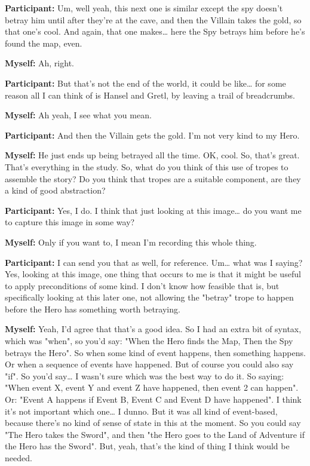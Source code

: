 \documentclass[11pt]{report}
\begin{document}
\begin{linenumbers}
\textbf{Participant:} Um, well yeah, this next one is similar except the spy doesn't betray him until after they're at the cave, and then the Villain takes the gold, so that one's cool. And again, that one makes\ldots{} here the Spy betrays him before he's found the map, even.

\textbf{Myself:} Ah, right.

\textbf{Participant:} But that's not the end of the world, it could be like\ldots{} for some reason all I can think of is Hansel and Gretl, by leaving a trail of breadcrumbs.

\textbf{Myself:} Ah yeah, I see what you mean.

\textbf{Participant:} And then the Villain gets the gold. I'm not very kind to my Hero.

\textbf{Myself:} He just ends up being betrayed all the time. OK, cool. So, that's great. That's everything in the study. So, what do you think of this use of tropes to assemble the story? Do you think that tropes are a suitable component, are they a kind of good abstraction?

\textbf{Participant:} Yes, I do. I think that just looking at this image\ldots{} do you want me to capture this image in some way?

\textbf{Myself:} Only if you want to, I mean I'm recording this whole thing.

\textbf{Participant:} I can send you that as well, for reference. Um\ldots{} what was I saying? Yes, looking at this image, one thing that occurs to me is that it might be useful to apply preconditions of some kind. I don't know how feasible that is, but specifically looking at this later one, not allowing the "betray" trope to happen before the Hero has something worth betraying.

\textbf{Myself:} Yeah, I'd agree that that's a good idea. So I had an extra bit of syntax, which was "when", so you'd say: "When the Hero finds the Map, Then the Spy betrays the Hero". So when some kind of event happens, then something happens. Or when a sequence of events have happened. But of course you could also say "if". So you'd say\ldots{} I wasn't sure which was the best way to do it. So saying: "When event X, event Y and event Z have happened, then event 2 can happen". Or: "Event A happens if Event B, Event C and Event D have happened". I think it's not important which one\ldots{} I dunno. But it was all kind of event-based, because there's no kind of sense of state in this at the moment. So you could say "The Hero takes the Sword", and then "the Hero goes to the Land of Adventure if the Hero has the Sword". But, yeah, that's the kind of thing I think would be needed.


\end{linenumbers}
\end{document}
